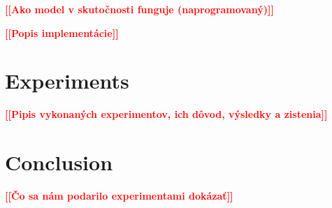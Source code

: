 \documentclass[a4paper, 11pt, a4paper]{article}
\newcommand{\todo}[1]{\textcolor{red}{\textbf{[[#1]]}}}
\begin{document}
\noindent\todo{Ako model v skutočnosti funguje (naprogramovaný)}

\noindent\todo{Popis implementácie}


\section{Experiments}

\todo{Pipis vykonaných experimentov, ich dôvod, výsledky a zistenia}


\section{Conclusion}

\todo{Čo sa nám podarilo experimentami dokázať}


\newpage


\renewcommand{\refname}{Sources}

\end{document}
